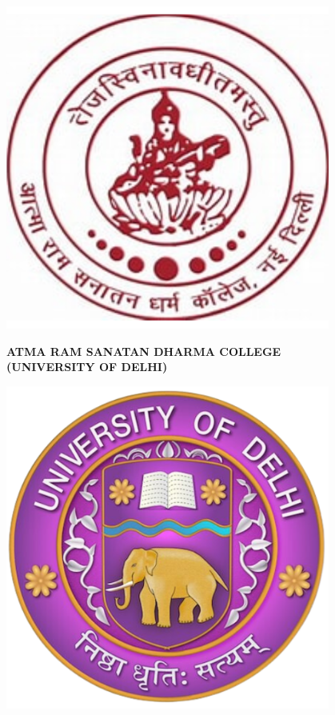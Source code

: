 \begin{titlepage}
    \centering
    \vspace*{0.1in}
    \begin{minipage}{0.19\textwidth}
        \centering
        \includegraphics[width=0.8\textwidth]{miscellaneous/arsd_logo.png} %
    \end{minipage}%
    \hfill
    \begin{minipage}{0.6\textwidth}
        \centering
        {\large \textbf{ATMA RAM SANATAN DHARMA COLLEGE}} \\
        \vspace{0.5cm}
        {\large \textbf{(UNIVERSITY OF DELHI)}} 
    \end{minipage}%
    \hfill
    \begin{minipage}{0.19\textwidth}
        \centering
        \includegraphics[width=0.8\textwidth]{miscellaneous/du_logo.png} %
    \end{minipage}


\end{titlepage}

